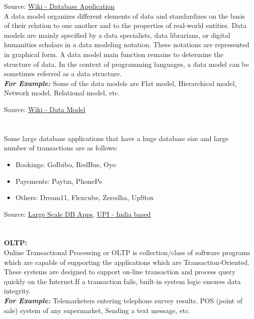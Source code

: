 \documentclass[12pt]{article}
\begin{document}
Source: \href{https://en.wikipedia.org/wiki/Database_application}{Wiki - Database Application} \\

A data model organizes different elements of data and standardizes on the basis of their relation to one another and to the properties of real-world entities. Data models are mainly specified by a data specialists, data librarians, or digital humanities scholars in a data modeling notation. These notations are represented in graphical form. A data model main function remains to determine the structure of data. In the context of programming languages, a data model can be sometimes referred as a data structure. \\
\textbf{\textit{For Example:}} Some of the data models are Flat model, Hierarchical model, Network model, Relational model, etc.

Source: \href{https://en.wikipedia.org/wiki/Data_model}{Wiki - Data Model} \\


\section{}
Some large database applications that have a huge database size and large number of transactions are as follows:
\begin{itemize}
    \item Bookings: GoIbibo, RedBus, Oyo
    \item Payements: Paytm, PhonePe
    \item Others: Dream11, Flexcube, Zerodha, UpStox
\end{itemize}

Source: \href{https://www.softwaretestinghelp.com/database-management-software/}{Large Scale DB Apps},  \href{https://techrrival.com/best-upi-apps-in-india/}{UPI - India based}

\section{} 
\textbf{OLTP:} \\
Online Transactional Processing or OLTP is collection/class of software programs which are capable of supporting the applications which are Transaction-Oriented. These systems are designed to support on-line transaction and process query quickly on the Internet.If a transaction fails, built-in system logic ensures data integrity. \\
\textbf{\textit{For Example:}} Telemarketers entering telephone survey results, POS (point of sale) system of any supermarket, Sending a text message, etc.
\end{document}
